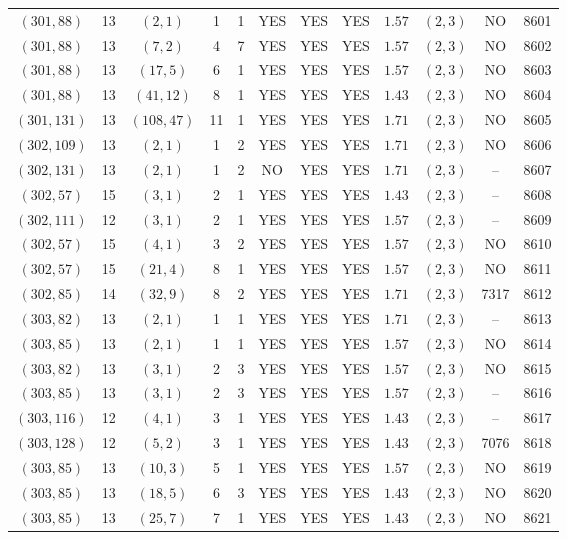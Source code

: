\begin{longtable}{|c|c|c|c|c|c|c|c|c|c|c|c|}
$(301,88)$ & 13 & $(2,1)$ & 1 & 1 & YES & YES & YES & $1.57$ & $(2,3)$ & NO & 8601\\
$(301,88)$ & 13 & $(7,2)$ & 4 & 7 & YES & YES & YES & $1.57$ & $(2,3)$ & NO & 8602\\
$(301,88)$ & 13 & $(17,5)$ & 6 & 1 & YES & YES & YES & $1.57$ & $(2,3)$ & NO & 8603\\
$(301,88)$ & 13 & $(41,12)$ & 8 & 1 & YES & YES & YES & $1.43$ & $(2,3)$ & NO & 8604\\
$(301,131)$ & 13 & $(108,47)$ & 11 & 1 & YES & YES & YES & $1.71$ & $(2,3)$ & NO & 8605\\
$(302,109)$ & 13 & $(2,1)$ & 1 & 2 & YES & YES & YES & $1.71$ & $(2,3)$ & NO & 8606\\
$(302,131)$ & 13 & $(2,1)$ & 1 & 2 & NO & YES & YES & $1.71$ & $(2,3)$ & -- & 8607\\
$(302,57)$ & 15 & $(3,1)$ & 2 & 1 & YES & YES & YES & $1.43$ & $(2,3)$ & -- & 8608\\
$(302,111)$ & 12 & $(3,1)$ & 2 & 1 & YES & YES & YES & $1.57$ & $(2,3)$ & -- & 8609\\
$(302,57)$ & 15 & $(4,1)$ & 3 & 2 & YES & YES & YES & $1.57$ & $(2,3)$ & NO & 8610\\
$(302,57)$ & 15 & $(21,4)$ & 8 & 1 & YES & YES & YES & $1.57$ & $(2,3)$ & NO & 8611\\
$(302,85)$ & 14 & $(32,9)$ & 8 & 2 & YES & YES & YES & $1.71$ & $(2,3)$ & 7317 & 8612\\
$(303,82)$ & 13 & $(2,1)$ & 1 & 1 & YES & YES & YES & $1.71$ & $(2,3)$ & -- & 8613\\
$(303,85)$ & 13 & $(2,1)$ & 1 & 1 & YES & YES & YES & $1.57$ & $(2,3)$ & NO & 8614\\
$(303,82)$ & 13 & $(3,1)$ & 2 & 3 & YES & YES & YES & $1.57$ & $(2,3)$ & NO & 8615\\
$(303,85)$ & 13 & $(3,1)$ & 2 & 3 & YES & YES & YES & $1.57$ & $(2,3)$ & -- & 8616\\
$(303,116)$ & 12 & $(4,1)$ & 3 & 1 & YES & YES & YES & $1.43$ & $(2,3)$ & -- & 8617\\
$(303,128)$ & 12 & $(5,2)$ & 3 & 1 & YES & YES & YES & $1.43$ & $(2,3)$ & 7076 & 8618\\
$(303,85)$ & 13 & $(10,3)$ & 5 & 1 & YES & YES & YES & $1.57$ & $(2,3)$ & NO & 8619\\
$(303,85)$ & 13 & $(18,5)$ & 6 & 3 & YES & YES & YES & $1.43$ & $(2,3)$ & NO & 8620\\
$(303,85)$ & 13 & $(25,7)$ & 7 & 1 & YES & YES & YES & $1.43$ & $(2,3)$ & NO & 8621\\

\end{longtable}
